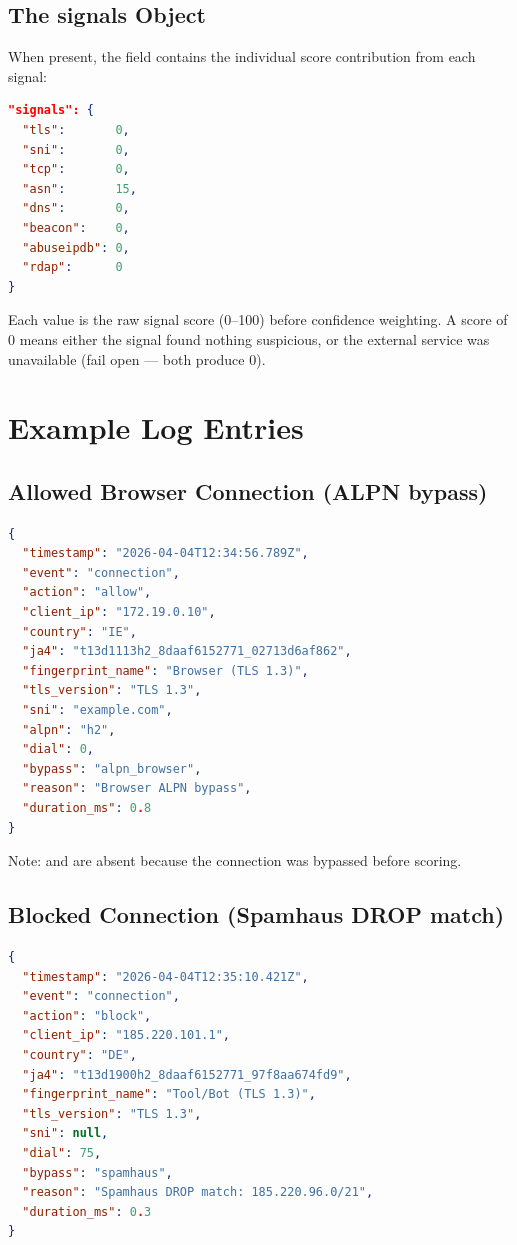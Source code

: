 \subsection{The signals Object}

When present, the  field contains the individual score contribution
from each signal:

\begin{lstlisting}[language=json]
"signals": {
  "tls":       0,
  "sni":       0,
  "tcp":       0,
  "asn":       15,
  "dns":       0,
  "beacon":    0,
  "abuseipdb": 0,
  "rdap":      0
}
\end{lstlisting}

Each value is the raw signal score (0–100) before confidence weighting. A score of 0
means either the signal found nothing suspicious, or the external service was
unavailable (fail open — both produce 0).

\section{Example Log Entries}

\subsection{Allowed Browser Connection (ALPN bypass)}

\begin{lstlisting}[language=json]
{
  "timestamp": "2026-04-04T12:34:56.789Z",
  "event": "connection",
  "action": "allow",
  "client_ip": "172.19.0.10",
  "country": "IE",
  "ja4": "t13d1113h2_8daaf6152771_02713d6af862",
  "fingerprint_name": "Browser (TLS 1.3)",
  "tls_version": "TLS 1.3",
  "sni": "example.com",
  "alpn": "h2",
  "dial": 0,
  "bypass": "alpn_browser",
  "reason": "Browser ALPN bypass",
  "duration_ms": 0.8
}
\end{lstlisting}

Note:  and  are absent because the connection was
bypassed before scoring.

\subsection{Blocked Connection (Spamhaus DROP match)}

\begin{lstlisting}[language=json]
{
  "timestamp": "2026-04-04T12:35:10.421Z",
  "event": "connection",
  "action": "block",
  "client_ip": "185.220.101.1",
  "country": "DE",
  "ja4": "t13d1900h2_8daaf6152771_97f8aa674fd9",
  "fingerprint_name": "Tool/Bot (TLS 1.3)",
  "tls_version": "TLS 1.3",
  "sni": null,
  "dial": 75,
  "bypass": "spamhaus",
  "reason": "Spamhaus DROP match: 185.220.96.0/21",
  "duration_ms": 0.3
}
\end{lstlisting}

